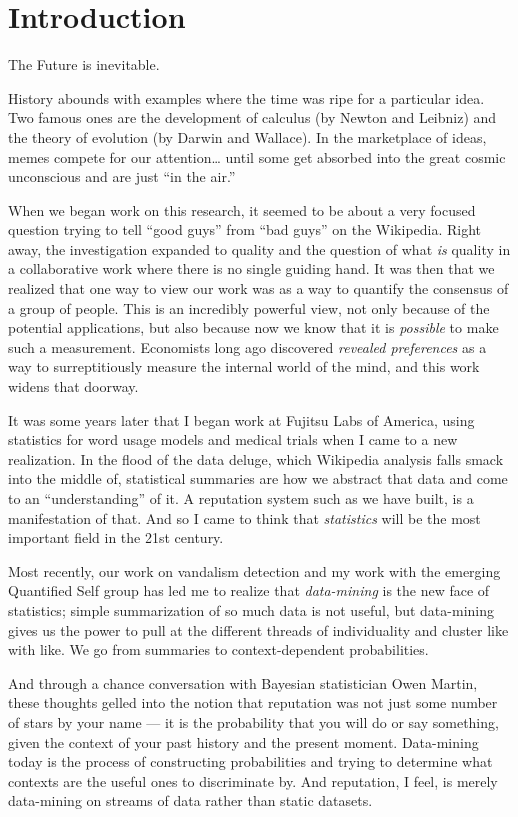 \section{Introduction}

The Future is inevitable.

History abounds with examples where the time was ripe for a particular idea.
Two famous ones are the development of calculus (by Newton and Leibniz)
and the theory of evolution (by Darwin and Wallace).
In the marketplace of ideas, memes compete for our attention\ldots
until some get absorbed into the great cosmic unconscious and
are just ``in the air.''

When we began work on this research, it seemed to be about a very focused
question trying to tell ``good guys'' from ``bad guys'' on the Wikipedia.
Right away, the investigation expanded to quality and the question of what
\textit{is} quality in a collaborative work where there is no single
guiding hand.
It was then that we realized that one way to view our work was as a
way to quantify the consensus of a group of people.
This is an incredibly powerful view, not only because of the potential
applications, but also because now we know that it is \textit{possible}
to make such a measurement.
Economists long ago discovered \textit{revealed preferences}
as a way to surreptitiously measure the internal world of the mind,
and this work widens that doorway.

It was some years later that I began work at Fujitsu Labs of America,
using statistics for word usage models and medical trials when I came to
a new realization.
In the flood of the data deluge, which Wikipedia analysis falls smack
into the middle of, statistical summaries are how we abstract that data
and come to an ``understanding'' of it.
A reputation system such as we have built, is a manifestation of that.
And so I came to think that \textit{statistics} will be the
most important field in the 21st century.

Most recently, our work on vandalism detection and my work with the
emerging Quantified Self group has led me to realize that
\textit{data-mining} is the new face of statistics; simple summarization
of so much data is not useful, but data-mining gives us the power to
pull at the different threads of individuality and cluster like with like.
We go from summaries to context-dependent probabilities.

And through a chance conversation with Bayesian statistician
Owen Martin, these thoughts gelled into the notion that reputation
was not just some number of stars by your name --- it is the probability
that you will do or say something, given the context of your past history
and the present moment.
Data-mining today is the process of constructing probabilities and
trying to determine what contexts are the useful ones to discriminate by.
And reputation, I feel, is merely data-mining on streams of data
rather than static datasets.

